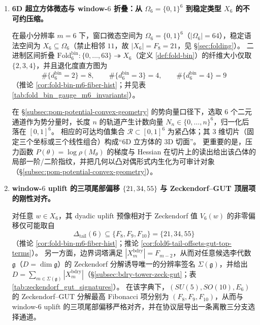 \begin{enumerate}
  \item \textbf{6D 超立方体微态与 window-\(6\) 折叠：从 \(\Omega_6=\{0,1\}^6\) 到稳定类型 \(X_6\) 的不可约压缩。}

  \begin{theorem}
  \label{thm:terminal-foldbin6-64-to-21-hist}
  在最小分辨率 \(m=6\) 下，窗口微态空间为 \(\Omega_6=\{0,1\}^6\)（\(|\Omega_6|=64\)），稳定语法空间为 \(X_6\subseteq\Omega_6\)（禁止相邻 \(11\)，故 \(|X_6|=F_8=21\)，见 \S\ref{sec:folding}）。
  二进制区间折叠 \(\mathrm{Fold}^{\mathrm{bin}}_6:\{0,\dots,63\}\twoheadrightarrow X_6\)（定义 \ref{def:fold-bin}）的纤维大小仅取
  \(\{2,3,4\}\)，并且退化度直方图为
  \[
  \#\{d^{\mathrm{bin}}_6=2\}=8,\qquad
  \#\{d^{\mathrm{bin}}_6=3\}=4,\qquad
  \#\{d^{\mathrm{bin}}_6=4\}=9
  \]
  （推论 \ref{cor:fold-bin-m6-fiber-hist}；并见表 \ref{tab:fold_bin_gauge_m6_invariants}）。
  \end{theorem}

  \begin{proposition}
  \label{prop:terminal-6d-reachable-mean-convex-body}
  在 \S\ref{subsec:pom-potential-convex-geometry} 的势向量口径下，选取 \(6\) 个二元通道作为势分量时，长度 \(n\) 的轨道产生计数向量
  \(N_n\in\{0,\dots,n\}^6\)，归一化后落在 \([0,1]^6\)。
  相应的可达均值集合 \(\mathcal{R}\subset[0,1]^6\) 为紧凸体；其 \(3\) 维切片（固定三个坐标或三个线性组合）构成“6D 立方体的 3D 切面”。
  更重要的是，压力函数 \(P(\theta)=\log\rho(M_\theta)\) 的梯度与 Hessian 在切片上的读出给出该凸体的局部一阶/二阶指纹，并把几何以凸对偶形式内生化为可审计对象（\S\ref{subsec:pom-potential-convex-geometry}）。
  \end{proposition}

  \item \textbf{window-\(6\) uplift 的三项尾部偏移 \(\{21,34,55\}\) 与 Zeckendorf--GUT 顶层项的刚性对齐。}

  \begin{theorem}
  \label{thm:terminal-window6-tail-three-branch}
  对任意 \(w\in X_6\)，其 dyadic uplift 预像相对于 Zeckendorf 值 \(V_6(w)\) 的非零偏移仅可能取自
  \[
  \Delta_{\mathrm{tail}}(6)\subseteq\{F_8,F_9,F_{10}\}=\{21,34,55\}
  \]
  （推论 \ref{cor:fold-bin-m6-fiber-hist}；推论 \ref{cor:fold6-tail-offsets-gut-top-terms}）。
  另一方面，边界词塔满足 \(|X_m^{\mathrm{bdry}}|=F_{m-2}\)，从而对任意候选李代数 \(\mathfrak g\)（\(D=\dim\mathfrak g\)）的 Zeckendorf 分解诱导唯一的分辨率签名 \(\Sigma(\mathfrak g)\)，并给出
  \(D=\sum_{m\in\Sigma(\mathfrak g)}|X_m^{\mathrm{bdry}}|\)（\S\ref{subsec:bdry-tower-zeck-gut}；表 \ref{tab:zeckendorf_gut_signatures}）。
  在该字典下，\((SU(5),SO(10),E_6)\) 的 Zeckendorf--GUT 分解最高 Fibonacci 项分别为 \((F_8,F_9,F_{10})\)，从而与 window-\(6\) uplift 的三项尾部偏移严格对齐，并在协议层导出一条离散三分支选择通道。
  \end{theorem}


\end{enumerate}
